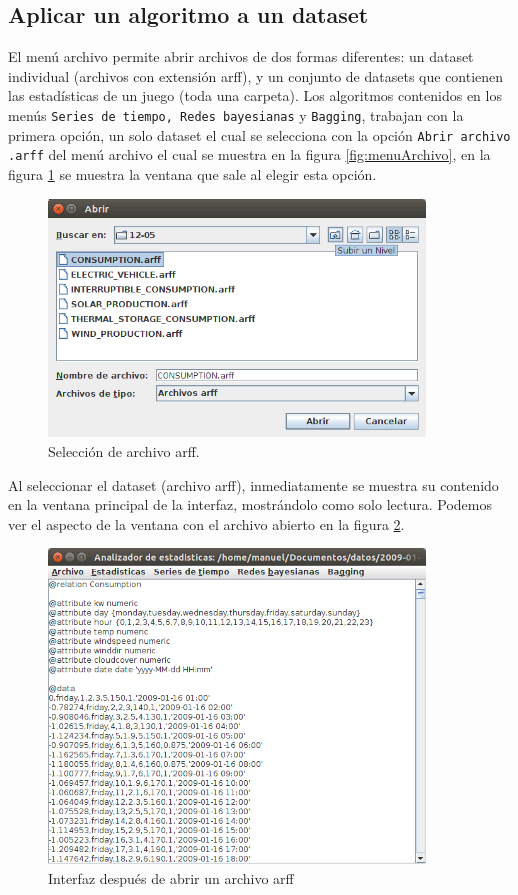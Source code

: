 \subsection{Aplicar un algoritmo a un dataset}
El menú archivo permite abrir archivos de dos formas diferentes: un dataset individual (archivos con extensión arff), y un conjunto de datasets que contienen las estadísticas de un juego (toda una carpeta). Los algoritmos contenidos en los menús \texttt{Series de tiempo, Redes bayesianas} y \texttt{Bagging}, trabajan con la primera opción, un solo dataset el cual se selecciona con la opción \texttt{Abrir archivo .arff} del menú archivo el cual se muestra en la figura \ref{fig:menuArchivo}, en la figura \ref{fig:seleccionArchivo} se muestra la ventana que sale al elegir esta opción.

\begin{figure}[ht]
	\centering
	\includegraphics[width=10cm]{img/seleccionArchivo.png}
	\caption{Selección de archivo arff.}
	\label{fig:seleccionArchivo}
\end{figure}

Al seleccionar el dataset (archivo arff), inmediatamente se muestra su contenido en la ventana principal de la interfaz, mostrándolo como solo lectura. Podemos ver el aspecto de la ventana con el archivo abierto en la figura \ref{fig:archivoAbierto}. 
\begin{figure}[h]
	\centering
	\includegraphics[width=10cm]{img/archivoAbierto.png}
	\caption{Interfaz después de abrir un archivo arff}
	\label{fig:archivoAbierto}
\end{figure}

